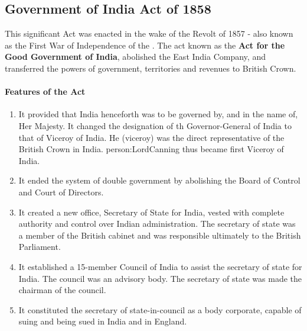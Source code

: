 \subsection*{Government of India Act of 1858}

This significant Act was enacted in the wake of the Revolt of 1857 - also known as the First War of Independence of the . The act known as the \textbf{Act for the Good Government of India}, abolished the East India Company, and transferred the powers of government, territories and revenues to British Crown.

\paragraph{Features of the Act}
\begin{enumerate}
  \item It provided that India henceforth was to be governed by, and in the name of, Her Majesty. It changed the designation of th Governor-General of India to that of Viceroy of India. He (viceroy) was the direct representative of the British Crown in India. \gls{person:LordCanning} thus became first Viceroy of India.
  \item It ended the system of double government by abolishing the Board of Control and Court of Directors.
  \item It created a new office, Secretary of State for India, vested with complete authority and control over Indian administration. The secretary of state was a member of the British cabinet and was responsible ultimately to the British Parliament.
  \item It established a 15-member Council of India to assist the secretary of state for India. The council was an advisory body. The secretary of state was made the chairman of the council.
  \item It constituted the secretary of state-in-council as a body corporate, capable of suing and being sued in India and in England.
\end{enumerate}



